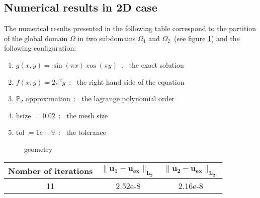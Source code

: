 \subsection{Numerical results in 2D case}
\label{sec:numerical-results-1}
The numerical results presented in the following table correspond to the partition of the global domain $\Omega$ in two subdomains $\Omega_1$ and $\Omega_2$~(see figure \ref{fig:original}) and the following configuration:
\begin{enumerate}
\item $ g(x,y) = \sin(\pi x)\cos(\pi y)$~:~ the exact solution
\item $f(x,y) = 2\pi^2g$~:~ the right hand side of the equation
\item $\mathbb P_2$ approximation~:~ the lagrange polynomial order
\item hsize $= 0.02$~:~ the mesh size
\item tol $=1e-9$~:~ the tolerance
\end{enumerate}

\begin{figure}[htbp]
  \centering
  \hspace{0.25cm}
  \caption{geometry}
  \label{fig:original}
\end{figure}

\vspace{0.3cm}
\begin{center}
  \begin{tabular}{|c|c|c|}
  \hline
   \textbf{Nomber of iterations} & $\mathbf {\| u_1-u_{ex}\|_{L_2} }$ & $\mathbf{\| u_2-u_{ex}\|_{L_2}}$ \\
   \hline
    11 & 2.52e-8 & 2.16e-8 \\
   \hline
 \end{tabular}
\end{center}
\vspace{0.2cm}
